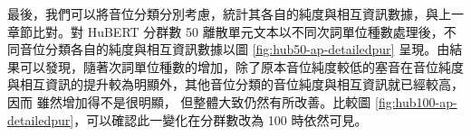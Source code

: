   
        最後，我們可以將音位分類分別考慮，統計其各自的純度與相互資訊數據，與上一章節比對。對 HuBERT 分群數 50 離散單元文本以不同次詞單位種數處理後，不同音位分類各自的純度與相互資訊數據以圖 \ref{fig:hub50-ap-detailedpur} 呈現。由結果可以發現，隨著次詞單位種數的增加，除了原本音位純度較低的塞音在音位純度與相互資訊的提升較為明顯外，其他音位分類的音位純度與相互資訊就已經較高，因而
雖然增加得不是很明顯，
但整體大致仍然有所改善。比較圖 \ref{fig:hub100-ap-detailedpur}，可以確認此一變化在分群數改為 100 時依然可見。








